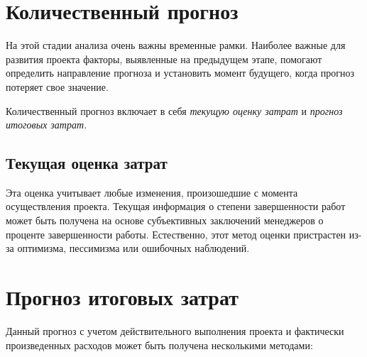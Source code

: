 \section{Количественный прогноз}

На этой стадии анализа очень важны временные рамки. Наиболее важные для развития проекта факторы, выявленные на предыдущем этапе, помогают определить направление прогноза и установить момент будущего, когда прогноз потеряет свое значение.

Количественный прогноз включает в себя \textit{текущую оценку затрат} и \textit{прогноз итоговых затрат.}

\subsection{Текущая оценка затрат}
Эта оценка учитывает любые изменения, произошедшие с момента осуществления проекта. 
Текущая информация о степени завершенности работ может быть получена на основе субъективных заключений менеджеров о проценте завершенности работы. 
Естественно, этот метод оценки пристрастен из-за оптимизма, пессимизма или ошибочных наблюдений.

\section{Прогноз итоговых затрат}
Данный прогноз с учетом действительного выполнения проекта и фактически произведенных расходов может быть получена несколькими методами:

